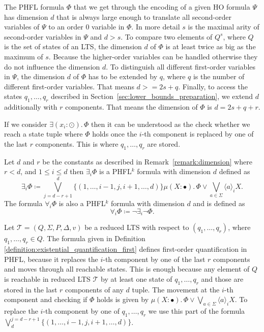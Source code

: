 \begin{remark}
\label{remark:dimension}
    The PHFL formula $\Phi$ that we get through the encoding of a given HO formula $\Psi$ has dimension
    $d$ that is always large enough to translate all second-order variables of $\Psi$ to an order $0$ variable in
    $\Phi$. In more detail $s$ is the maximal arity of second-order variables in $\Psi$ and $d > s$. To compare
    two  elements of $Q^{s}$, where $Q$ is the set of states of an LTS, the dimension $d$ of 
    $\Phi$ is at least twice as big as the maximum of $s$. Because the higher-order variables can be handled otherwise they do not influence the dimension $d$. To distinguish all
    different first-order variables in $\Psi$, the dimension $d$ of $\Phi$ has to be extended by $q$, where $q$ is the number of different first-order variables. That means $d >= 2s + q$. Finally, to access the 
    states $q_1, \dots, q_r$ described in Section~\ref{sec:lower_bounds_preparation}, 
    we extend $d$ additionally with $r$ components. That means the dimension of $\Phi$ is $d = 2s + q + r$.
\end{remark}

If we consider $\exists (x_i \colon \odot).\,\Phi$ then it can be understood as the check whether we reach a state tuple where $
\Phi$ holds once the $i$-th component is replaced by one of the last $r$ components. This is where $q_1, \dots, q_r$ are stored.

\begin{definition}
\label{definition:existential_quantification_first}
    Let $d$ and $r$ be the constants as described in Remark~\ref{remark:dimension} where $r < d$, and $1 \leq i \leq d$ then $\exists_i \Phi$ is a PHFL$^k$ formula with dimension $d$ defined as
    \[\exists_i \Phi \coloneqq \bigvee^{d}_{j=d-r+1} \{(1, \dots, i-1, j, i + 1, \dots, d)\} \mu (X
    \colon \bullet).\,\Phi \vee \bigvee_{a \in \Sigma} \langle a \rangle_{i} X.\]
    The formula $\forall_i \Phi$ is also a PHFL$^k$ formula with dimension $d$ and is defined as
    \[\forall_i \Phi \coloneqq \neg \exists_i \neg \Phi.\]
\end{definition}
\begin{observation}
\label{observation:existential_quantification_first}
		Let $\mathcal{T} = (Q, \Sigma, P, \Delta, v)$ be a reduced LTS with respect to $(q_1, \dots, q_r)$, where $q_1, \dots, q_r \in Q$. The formula given in Definition~
		\ref{definition:existential_quantification_first} defines first-order quantification in PHFL, because it replaces the $i$-th component by one of the last $r$ components and moves 
		through all reachable states. This is enough because any element of $Q$ is reachable in reduced LTS $\mathcal{T}$ by at least one state of 
        $q_1, \dots, q_r$ and those are stored in the last $r$ components of any $d$ tuple. The movement at the $i$-th component and checking if $\Phi$ 
        holds is given by $\mu (X \colon \bullet).\,\Phi \vee \bigvee_{a \in \Sigma} \langle a 
        \rangle_{i} X$. To replace the $i$-th component by one of $q_1, \dots, q_r$ 
        we use this part of the formula $\bigvee_{d}^{j=d-r+1} \{(1, \dots, i-1, j, i + 1, \dots, d)\}$.
\end{observation}

